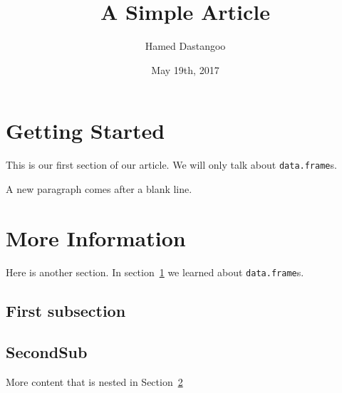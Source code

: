 \documentclass{article}
\author{Hamed Dastangoo}
\title{A Simple Article}
\date{May 19th, 2017}
\newcommand{\dataframe}{\texttt{data.frame}}
\begin{document}

\maketitle
\tableofcontents
\section{Getting Started}
\label{sec:GettingStarted}
This is our first section of our article. We will only talk about \dataframe{}s.

A new paragraph comes after a blank line.

\section{More Information}
\label{sec:MoreInfo}
Here is another section. In section~\ref{sec:GettingStarted} we learned about \dataframe{}s.
\subsection{First subsection}
\label{FirstSub}
\subsection{SecondSub}
\label{SecondSub}
More content that is nested in Section~\ref{sec:MoreInfo}
\end{document}
